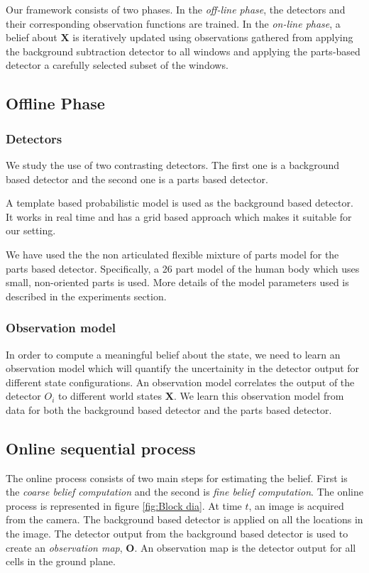\documentclass[10pt,twocolumn,letterpaper]{article}
\begin{document}
Our framework consists of two phases.   In the \emph{off-line phase}, the detectors and their corresponding observation functions are trained.  In the \emph{on-line phase}, a belief about $\mathbf{X}$ is iteratively updated using observations gathered from applying the background subtraction detector to all windows and applying the parts-based detector a carefully selected subset of the windows.

\subsection{Offline Phase}
 
 \subsubsection{Detectors}
We study the use of two contrasting detectors. The first one is a background based detector and the second one is a parts based detector.

A template based probabilistic model is used as the background based detector\cite{englebienneFast}. It works in real time and has a grid based approach which makes it suitable for our setting.

We have used the the non articulated flexible mixture of parts model\cite{partsDeva} for the parts based detector. Specifically, a 26 part model of the human body which uses small, non-oriented parts is used.
More details of the model parameters used is described in the experiments section.

\subsubsection{Observation model}
In order to compute a meaningful belief about the state, we need to learn an observation model which will quantify the uncertainity in the detector output for different state configurations. An observation model correlates the output of the detector $O_{i}$ to different world states $\textbf{X}$.
We learn this observation model from data for both the background based detector and the parts based detector.
\subsection{Online sequential process}
The online process consists of two main steps for estimating the belief. First is the \textit{coarse belief computation} and the second is \textit{fine belief computation}. The online process is represented in figure \ref{fig:Block dia}.
At time $t $, an image is acquired from the camera. The background based detector is applied on all the locations in the image. The detector output from the background based detector is used to create an \textit{observation map}, $\textbf{O}$. An observation map is the detector output for all cells in the ground plane.  
\end{document}
